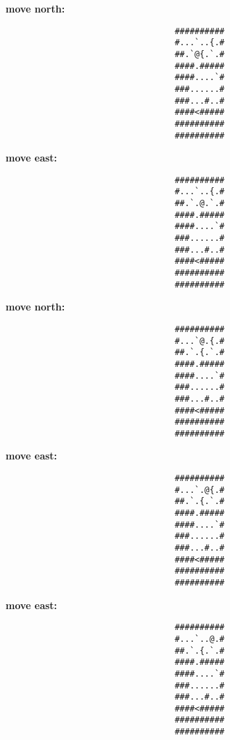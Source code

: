 \begin{MyGreenBox}[frametitle={\textbf{Iteration 2 MiniHack Prompt}}]
{\textbf{move north:}
\begin{verbatim}
                                  ##########
                                  #...`..{.#
                                  ##.`@{.`.#
                                  ####.#####
                                  ####....`#
                                  ###......#
                                  ###...#..#
                                  ####<#####
                                  ##########
                                  ##########
\end{verbatim}

\textbf{move east:}
\begin{verbatim}
                                  ##########
                                  #...`..{.#
                                  ##.`.@.`.#
                                  ####.#####
                                  ####....`#
                                  ###......#
                                  ###...#..#
                                  ####<#####
                                  ##########
                                  ##########
\end{verbatim}

\textbf{move north:}
\begin{verbatim}
                                  ##########
                                  #...`@.{.#
                                  ##.`.{.`.#
                                  ####.#####
                                  ####....`#
                                  ###......#
                                  ###...#..#
                                  ####<#####
                                  ##########
                                  ##########
\end{verbatim}

\textbf{move east:}
\begin{verbatim}
                                  ##########
                                  #...`.@{.#
                                  ##.`.{.`.#
                                  ####.#####
                                  ####....`#
                                  ###......#
                                  ###...#..#
                                  ####<#####
                                  ##########
                                  ##########
\end{verbatim}

\textbf{move east:}
\begin{verbatim}
                                  ##########
                                  #...`..@.#
                                  ##.`.{.`.#
                                  ####.#####
                                  ####....`#
                                  ###......#
                                  ###...#..#
                                  ####<#####
                                  ##########
                                  ##########
\end{verbatim}

}
\end{MyGreenBox}
